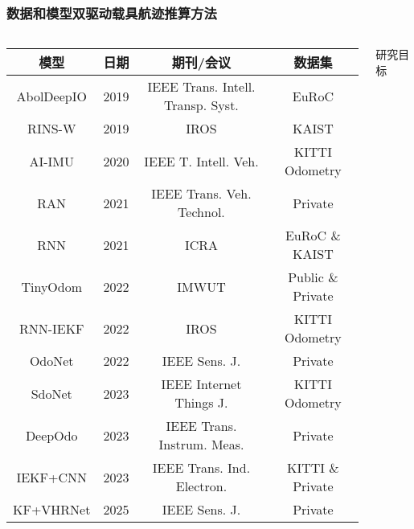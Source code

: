\begin{frame}
    \frametitle{数据和模型双驱动载具航迹推算方法}
	\begin{columns}[t]
		\begin{column}{0.5\textwidth}
		{
		    \tiny
		    \setlength{\tabcolsep}{2pt}
	   		\begin{tabular*}{\linewidth}{@{\extracolsep{\fill}}cccc}
				\toprule
				\multicolumn{1}{c}{模型} & 日期 & 期刊/会议 & 数据集 \\
				\midrule
				AbolDeepIO & 2019 & IEEE Trans. Intell. Transp. Syst. & EuRoC          \\ %
				RINS-W     & 2019 & IROS                              & KAIST          \\ %
				AI-IMU     & 2020 & IEEE T. Intell. Veh.              & KITTI Odometry \\ %
				RAN        & 2021 & IEEE Trans. Veh. Technol.         & Private         \\ %
				RNN        & 2021 & ICRA                              & EuRoC \& KAIST    \\ 
				TinyOdom   & 2022 & IMWUT                             & Public \& Private \\
				RNN-IEKF   & 2022 & IROS                              & KITTI Odometry    \\
				OdoNet     & 2022 & IEEE Sens. J.                     & Private         \\ %
				SdoNet     & 2023 & IEEE Internet Things J.           & KITTI Odometry \\ %
				DeepOdo    & 2023 & IEEE Trans. Instrum. Meas.        & Private         \\ %
				IEKF+CNN   & 2023 & IEEE Trans. Ind. Electron.        & KITTI \& Private         \\ %
				KF+VHRNet  & 2025 & IEEE Sens. J.                     & Private         \\ %
				\bottomrule
	   		\end{tabular*}
		}
		\end{column}   
		\begin{column}{0.5\textwidth}
		    \begin{block}{研究目标}

\end{block}
\end{column}
\end{columns}
\end{frame}
